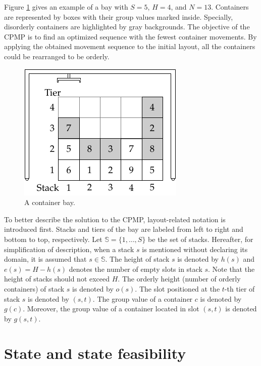 \documentclass[review,3p,times,12pt,number]{elsarticle}\usepackage{amsmath}\usepackage{amssymb}
\begin{document}
Figure \ref{fig:bay} gives an example of a bay with $S=5$, $H=4$, and $N=13$. Containers are represented by boxes with their group values marked inside.
Specially, disorderly containers are highlighted by gray backgrounds.
The objective of the CPMP is to find an optimized sequence with the fewest container movements. By applying the obtained movement sequence to the initial layout, all the containers could be rearranged to be orderly.

\begin{figure}[htbp]
\centering
\includegraphics{figs/bay.pdf}
\caption{A container bay.}
\label{fig:bay}
\end{figure}


To better describe the solution to the CPMP, layout-related notation is introduced first.
Stacks and tiers of the bay are labeled from left to right and bottom to top, respectively.
Let $\mathbb{S}=\{1,\dots,S\}$ be the set of stacks. Hereafter, for simplification of description, when a stack $s$ is mentioned without declaring its domain, it is assumed that $s\in\mathbb{S}$. The height of stack $s$ is denoted by $h(s)$ and $e(s)=H-h(s)$ denotes the number of empty slots in stack $s$. Note that the height of stacks should not exceed $H$.
The orderly height (number of orderly containers) of stack $s$ is denoted by $o(s)$.
The slot positioned at the $t$-th tier of stack $s$ is denoted by $(s,t)$.
The group value of a container $c$ is denoted by $g(c)$.
Moreover, the group value of a container located in slot $(s,t)$ is denoted by $g(s,t)$.







\section{State and state feasibility}
\label{sec:state}
\end{document}
